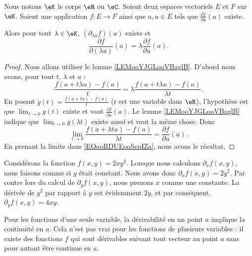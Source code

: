 \begin{lemma}       \label{LEMooVOTHooPJcrWH}
	Nous notons \( \eK\) le corps \( \eR\) ou \( \eC\). Soient deux espaces vectoriels \( E\) et \( F\) sur \( \eK\). Soient une application \( f\colon E\to F\) ainsi que \( a,u\in E\) tels que \( \frac{ \partial f }{ \partial u }(a)\) existe.

	Alors pour tout \( \lambda\in \eK\), \( (\partial_{\lambda u}f)(a)\) existe et
	\begin{equation}
		\frac{ \partial f }{ \partial (\lambda u) }(a)=\lambda\frac{ \partial f }{ \partial u }(a).
	\end{equation}
\end{lemma}

\begin{proof}
	Nous allons utiliser le lemme \ref{LEMooYJGLooVBaglB}. D'abord nous avons, pour tout \( t\), \( \lambda\) et \( a\)  :
	\begin{equation}        \label{EQooRDUEooScpIZa}
		\frac{ f(a+t\lambda u)-f(a) }{ t }=\lambda\frac{ f(a+t\lambda u)-f(a) }{ \lambda t }.
	\end{equation}
	En posant \( g(t)=\frac{ f(a+tu)-f(a) }{ t }\) (\( t\) est une variable dans \( \eR\)), l'hypothèse est que \( \lim_{t\to 0} g(t)\) existe et vaut \( \frac{ \partial f }{ \partial u }(a)\). Le lemme \ref{LEMooYJGLooVBaglB} indique que \( \lim_{t\to 0} g(\lambda t)\) existe aussi et vaut la même chose. Donc
	\begin{equation}
		\lim_{t\to 0} \frac{ f(a+\lambda tu)-f(a) }{ \lambda t }=\frac{ \partial f }{ \partial u }(a).
	\end{equation}
	En prenant la limite dans \eqref{EQooRDUEooScpIZa}, nous avons le résultat.
\end{proof}

\begin{example}
	Considérons la fonction \( f(x,y)=2xy^2\). Lorsque nous calculons \( \partial_xf(x,y)\), nous faisons comme si \( y\) était constant. Nous avons donc \( \partial_xf(x,y)=2y^2\). Par contre lors du calcul de \( \partial_yf(x,y)\), nous prenons \( x\) comme une constante. La dérivée de \( y^2\) par rapport à \( y\) est évidemment \( 2y\), et par conséquent, \( \partial_yf(x,y)=4xy\).
\end{example}


Pour les fonctions d'une seule variable, la dérivabilité en un point \( a\) implique la continuité en \( a\). Cela n'est pas vrai pour les fonctions de plusieurs variables : il existe des fonctions \( f\)  qui sont dérivables suivant tout vecteur au point \( a\) sans pour autant être continue en \( a\).

